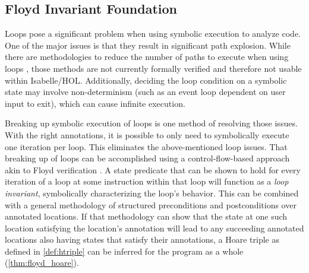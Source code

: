 \subsection{Floyd Invariant Foundation}\label{se:cfg_invariant}
Loops pose a significant problem when using symbolic execution to analyze code.%
One of the major issues is that they result in significant path explosion.%
While there are methodologies to reduce the number of paths to execute
when using loops \autocite{saxena2009lese,obdrzalek2011efficient},
those methods are not currently formally verified
and therefore not usable within Isabelle/HOL.
Additionally, deciding the loop condition on a symbolic state
may involve non-determinism (such as an event loop dependent on user input to exit),%
which can cause infinite execution.

Breaking up symbolic execution of loops is one method of resolving those issues.
With the right annotations,
it is possible to only need to symbolically execute one iteration per loop.
This eliminates the above-mentioned loop issues.
That breaking up of loops can be accomplished using a control-flow-based approach
akin to Floyd verification \autocite{floyd1967assigning}.%
A state predicate that can be shown to hold for every iteration of a loop
at some instruction within that loop will function as a \emph{loop invariant},%
symbolically characterizing the loop's behavior.
This can be combined with a general methodology of structured preconditions and postconditions over annotated locations.
If that methodology can show that the state at one such location
satisfying the location's annotation will lead to any succeeding annotated locations
also having states that satisfy their annotations,
a Hoare triple as defined in \cref{def:htriple}
can be inferred for the program as a whole (\cref{thm:floyd_hoare}).

